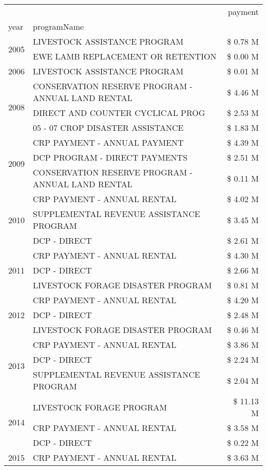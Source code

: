 \begin{tabular}{llr}
\toprule
 &  & payment \\
year & programName &  \\
\midrule
\multirow[t]{2}{*}{2005} & LIVESTOCK ASSISTANCE PROGRAM & \$ 0.78 M \\
 & EWE LAMB REPLACEMENT OR RETENTION & \$ 0.00 M \\
\cline{1-3}
2006 & LIVESTOCK ASSISTANCE PROGRAM & \$ 0.01 M \\
\cline{1-3}
\multirow[t]{3}{*}{2008} & CONSERVATION RESERVE PROGRAM - ANNUAL LAND RENTAL & \$ 4.46 M \\
 & DIRECT AND COUNTER CYCLICAL PROG & \$ 2.53 M \\
 & 05 - 07 CROP DISASTER ASSISTANCE & \$ 1.83 M \\
\cline{1-3}
\multirow[t]{3}{*}{2009} & CRP PAYMENT - ANNUAL PAYMENT & \$ 4.39 M \\
 & DCP PROGRAM - DIRECT PAYMENTS & \$ 2.51 M \\
 & CONSERVATION RESERVE PROGRAM - ANNUAL LAND RENTAL & \$ 0.11 M \\
\cline{1-3}
\multirow[t]{3}{*}{2010} & CRP PAYMENT - ANNUAL RENTAL & \$ 4.02 M \\
 & SUPPLEMENTAL REVENUE ASSISTANCE PROGRAM & \$ 3.45 M \\
 & DCP - DIRECT & \$ 2.61 M \\
\cline{1-3}
\multirow[t]{3}{*}{2011} & CRP PAYMENT - ANNUAL RENTAL & \$ 4.30 M \\
 & DCP - DIRECT & \$ 2.66 M \\
 & LIVESTOCK FORAGE DISASTER PROGRAM & \$ 0.81 M \\
\cline{1-3}
\multirow[t]{3}{*}{2012} & CRP PAYMENT - ANNUAL RENTAL & \$ 4.20 M \\
 & DCP - DIRECT & \$ 2.48 M \\
 & LIVESTOCK FORAGE DISASTER PROGRAM & \$ 0.46 M \\
\cline{1-3}
\multirow[t]{3}{*}{2013} & CRP PAYMENT - ANNUAL RENTAL & \$ 3.86 M \\
 & DCP - DIRECT & \$ 2.24 M \\
 & SUPPLEMENTAL REVENUE ASSISTANCE PROGRAM & \$ 2.04 M \\
\cline{1-3}
\multirow[t]{3}{*}{2014} & LIVESTOCK FORAGE PROGRAM & \$ 11.13 M \\
 & CRP PAYMENT - ANNUAL RENTAL & \$ 3.58 M \\
 & DCP - DIRECT & \$ 0.22 M \\
\cline{1-3}
\multirow[t]{3}{*}{2015} & CRP PAYMENT - ANNUAL RENTAL & \$ 3.63 M \\

\end{tabular}
